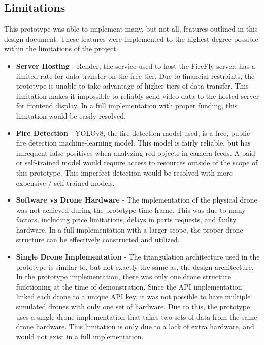 \documentclass[journal, onecolumn]{IEEEtran}
\begin{document}
\subsection{Limitations}
This prototype was able to implement many, but not all, features outlined in this design document. These features were implemented to the highest degree possible within the limitations of the project.
\begin{itemize}
    \item \textbf{Server Hosting} - Render, the service used to host the FireFly server, has a limited rate for data transfer on the free tier. Due to financial restraints, the prototype is unable to take advantage of higher tiers of data transfer. This limitation makes it impossible to reliably send video data to the hosted server for frontend display. In a full implementation with proper funding, this limitation would be easily resolved.
    \item \textbf{Fire Detection} - YOLOv8, the fire detection model used, is a free, public fire detection machine-learning model. This model is fairly reliable, but has infrequent false positives when analyzing red objects in camera feeds. A paid or self-trained model would require access to resources outside of the scope of this prototype. This imperfect detection would be resolved with more expensive / self-trained models. 
    \item \textbf{Software vs Drone Hardware} - The implementation of the physical drone was not achieved during the prototype time frame. This was due to many factors, including price limitations, delays in parts requests, and faulty hardware. In a full implementation with a larger scope, the proper drone structure can be effectively constructed and utilized.
    \item \textbf{Single Drone Implementation} - The triangulation architecture used in the prototype is similar to, but not exactly the same as, the design architecture. In the prototype implementation, there was only one drone structure functioning at the time of demonstration. Since the API implementation linked each drone to a unique API key, it was not possible to have multiple simulated drones with only one set of hardware. Due to this, the prototype uses a single-drone implementation that takes two sets of data from the same drone hardware. This limitation is only due to a lack of extra hardware, and would not exist in a full implementation.
\end{itemize}


\end{document}
